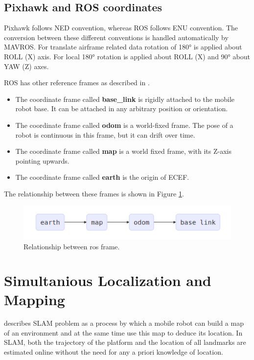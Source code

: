 \subsection{Pixhawk and ROS coordinates}

Pixhawk follows NED convention, whereas ROS follows ENU convention. The conversion between these different conventions is handled automatically by MAVROS. For translate airframe related data rotation of 180° is applied about ROLL (X) axis. For local 180° rotation is applied about ROLL (X) and 90° about YAW (Z) axes.

ROS has other reference frames as described in .

\begin{itemize}
	\item The coordinate frame called \textbf{base\_link} is rigidly attached to the mobile robot base. It can be attached in any arbitrary position or orientation.
	\item The coordinate frame called \textbf{odom} is a world-fixed frame. The pose of a robot is continuous in this frame, but it can drift over time.
	\item The coordinate frame called \textbf{map} is a world fixed frame, with its Z-axis pointing upwards. 
	\item The coordinate frame called \textbf{earth} is the origin of ECEF.
\end{itemize}

The relationship between these frames is shown in Figure \ref{fig:rosrefframes}.

\begin{figure}
	\centering
	\includegraphics[width=5in]{figures/ros_rel_frames}
	\caption[FAV of Antonomous Driving System.]{\small 
	Relationship between ros frame.  }
	\label{fig:rosrefframes}
\end{figure}

\section{Simultanious Localization and Mapping}

 describes SLAM problem as a process by which a mobile robot can build a map of an environment and at the same time use this map to deduce its location. In SLAM, both the trajectory of the platform and the location of all landmarks are estimated online without the need for any a priori knowledge of location.

